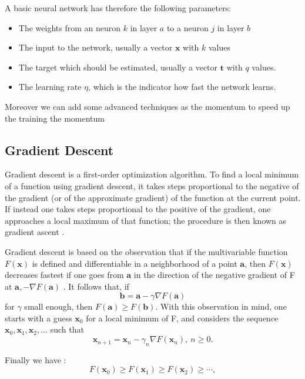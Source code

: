 \documentclass{acm_proc_article-sp}
\begin{document}
A basic neural network has therefore the following parameters:
\begin{itemize}
\item The weights from an neuron $k$ in layer $a$ to a neuron $j$ in layer $b$
\item The input to the network, usually a vector $\mathbf{x}$ with $k$ values
\item The target which should be estimated, usually a vector $\mathbf{t}$ with $q$ values.
\item The learning rate $\eta$, which is the indicator how fast the network learns.
\end{itemize}

Moreover we can add some advanced techniques as the momentum to speed up the training the momentum


\subsection{Gradient Descent}
Gradient descent is a first-order optimization algorithm. To find a local minimum of a function using gradient descent, it takes steps proportional to the negative of the gradient (or of the approximate gradient) of the function at the current point. If instead one takes steps proportional to the positive of the gradient, one approaches a local maximum of that function; the procedure is then known as gradient ascent \cite{Kiwiel2001,Qian1999}.

Gradient descent is based on the observation that if the multivariable function $F(\mathbf{x})$ is defined and differentiable in a neighborhood of a point $\mathbf{a}$, then $F(\mathbf{x})$ decreases fastest if one goes from $\mathbf{a}$ in the direction of the negative gradient of F at $\mathbf{a}, -\nabla F(\mathbf{a})$ \cite{Yuan1999}. It follows that, if
\begin{equation}
\mathbf{b} = \mathbf{a}-\gamma\nabla F(\mathbf{a})
\end{equation}
for $\gamma$ small enough, then $F(\mathbf{a})\geq F(\mathbf{b})$. With this observation in mind, one starts with a guess $\mathbf{x}_0$ for a local minimum of F, and considers the sequence $\mathbf{x}_0, \mathbf{x}_1, \mathbf{x}_2, \dots$ such that
\begin{equation}
\mathbf{x}_{n+1}=\mathbf{x}_n-\gamma_n \nabla F(\mathbf{x}_n),\ n \ge 0.
\end{equation}

Finally we have \cite{Cauchy1847}:
\begin{equation}
F(\mathbf{x}_0)\ge F(\mathbf{x}_1)\ge F(\mathbf{x}_2)\ge \cdots,
\end{equation}
\end{document}
